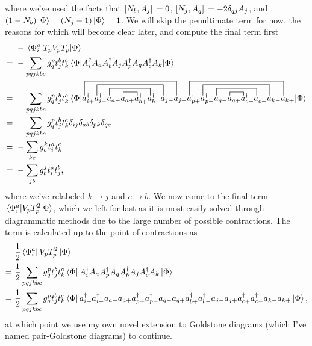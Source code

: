 \documentclass[Dual]{msu-thesis}
\begin{document}
where we've used the facts that $\comm*{N_b}{A_j}=0$, $\comm*{N_j}{A_q}=-2\delta_{qj}A_j$, and $(1-N_b)\ket{\Phi}=(N_j-1)\ket{\Phi}=1$. We will skip the penultimate term for now, the reasons for which will become clear later, and compute the final term first
\begin{align}
& \ -\mel{\Phi^a_i}{T_pV_pT_p}{\Phi}
\\
=& \
-\sum_{pqjkbc}g^p_qt^b_jt^c_k\mel{\Phi}{A^\dagger_iA_aA^\dagger_bA_jA^\dagger_pA_qA^\dagger_cA_k}{\Phi}
\nonumber
\\
=& \
-\sum_{pqjkbc}g^p_qt^b_jt^c_k\mel{\Phi}{
\contraction[4ex]{}{a}{^\dagger_{i+}a^\dagger_{i-}a_{a-}a_{a+}a^\dagger_{b+}a^\dagger_{b-}a_{j-}}{a}
\contraction[3ex]{a^\dagger_{i+}}{a}{^\dagger_{i-}a_{a-}a_{a+}a^\dagger_{b+}a^\dagger_{b-}}{a}
\contraction[2ex]{a^\dagger_{i+}a^\dagger_{i-}}{a}{_{a-}a_{a+}a^\dagger_{b+}}{a}
\contraction[1ex]{a^\dagger_{i+}a^\dagger_{i-}a_{a-}}{a}{_{a+}}{a}
\contraction[4ex]{a^\dagger_{i+}a^\dagger_{i-}a_{a-}a_{a+}a^\dagger_{b+}a^\dagger_{b-}a_{j-}a_{j+}}{a}{^\dagger_{p+}a^\dagger_{p-}a_{q-}a_{q+}a^\dagger_{c+}a^\dagger_{c-}a_{k-}}{a}
\contraction[3ex]{a^\dagger_{i+}a^\dagger_{i-}a_{a-}a_{a+}a^\dagger_{b+}a^\dagger_{b-}a_{j-}a_{j+}a^\dagger_{p+}}{a}{^\dagger_{p-}a_{q-}a_{q+}a^\dagger_{c+}a^\dagger_{c-}}{a}
\contraction[2ex]{a^\dagger_{i+}a^\dagger_{i-}a_{a-}a_{a+}a^\dagger_{b+}a^\dagger_{b-}a_{j-}a_{j+}a^\dagger_{p+}a^\dagger_{p-}}{a}{_{q-}a_{q+}a^\dagger_{c+}}{a}
\contraction[1ex]{a^\dagger_{i+}a^\dagger_{i-}a_{a-}a_{a+}a^\dagger_{b+}a^\dagger_{b-}a_{j-}a_{j+}a^\dagger_{p+}a^\dagger_{p-}a_{q-}}{a}{_{q+}}{a}
a^\dagger_{i+}a^\dagger_{i-}a_{a-}a_{a+}a^\dagger_{b+}a^\dagger_{b-}a_{j-}a_{j+}a^\dagger_{p+}a^\dagger_{p-}a_{q-}a_{q+}a^\dagger_{c+}a^\dagger_{c-}a_{k-}a_{k+}
}{\Phi}
\nonumber
\\
=& \
-\sum_{pqjkbc}g^p_qt^b_jt^c_k\delta_{ij}\delta_{ab}\delta_{pk}\delta_{qc}
\nonumber
\\
=& \
-\sum_{kc}g^k_ct^a_it^c_k
\nonumber
\\
=& \
-\sum_{jb}g^j_bt^a_it^b_j
,\end{align}
where we've relabeled $k\to j$ and $c\to b$. We now come to the final term $\mel*{\Phi_i^a}{V_pT^2_p}{\Phi}$, which we left for last as it is most easily solved through diagrammatic methods due to the large number of possible contractions. The term is calculated up to the point of contractions as
\begin{align}
&\ \frac{1}{2}\bra*{\Phi_i^a}V_pT_p^2\ket{\Phi}
\nonumber
\\
=&\ 
\frac{1}{2}\sum_{pqjkbc}g^p_qt^b_jt^c_k\bra{\Phi}A^\dagger_iA_aA^\dagger_pA_qA^\dagger_bA_jA^\dagger_cA_k\ket{\Phi}
\nonumber
\\
\label{long_cont}
=&\ 
\frac{1}{2}\sum_{pqjkbc}g^p_qt^b_jt^c_k\bra{\Phi}
a^\dagger_{i+}a^\dagger_{i-}a_{a-}a_{a+}a^\dagger_{p+}a^\dagger_{p-}a_{q-}a_{q+}a^\dagger_{b+}a^\dagger_{b-}a_{j-}a_{j+}a^\dagger_{c+}a^\dagger_{c-}a_{k-}a_{k+}
\ket{\Phi}
,\end{align}
at which point we use my own novel extension to Goldstone diagrams (which I've named pair-Goldstone diagrams) to continue.
\end{document}
